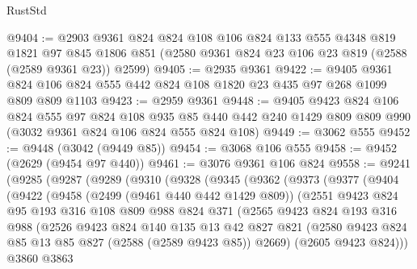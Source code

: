 \begin{lexlean}{RustStd}
\begin{coremodule}
@9404 := @2903
    @9361
    @824
    @824
    @108
    @106
    @824
    @133
    @555
    @4348
    @819
    @1821
    @97
    @845
    @1806
    @851
    (@2580 @9361 @824 @23 @106 @23 @819 (@2588 (@2589 @9361 @23)) @2599)
@9405 := @2935 @9361
@9422 := @9405
    @9361
    @824
    @106
    @824
    @555
    @442
    @824
    @108
    @1820
    @23
    @435
    @97
    @268
    @1099
    @809
    @809
    @1103
@9423 := @2959 @9361
@9448 := @9405
    @9423
    @824
    @106
    @824
    @555
    @97
    @824
    @108
    @935
    @85
    @440
    @442
    @240
    @1429
    @809
    @809
    @990
    (@3032 @9361 @824 @106 @824 @555 @824 @108)
@9449 := @3062 @555
@9452 := @9448 (@3042 (@9449 @85))
@9454 := @3068 @106 @555
@9458 := @9452 (@2629 (@9454 @97 @440))
@9461 := @3076 @9361 @106 @824
@9558 := @9241
    (@9285
      (@9287
        (@9289
          (@9310
            (@9328
              (@9345
                (@9362
                  (@9373
                    (@9377
                      (@9404
                        (@9422
                          (@9458
                            (@2499 (@9461 @440 @442 @1429 @809))
                            (@2551
                              @9423
                              @824
                              @95
                              @193
                              @316
                              @108
                              @809
                              @988
                              @824
                              @371
                              (@2565
                                @9423
                                @824
                                @193
                                @316
                                @988
                                (@2526
                                  @9423
                                  @824
                                  @140
                                  @135
                                  @13
                                  @42
                                  @827
                                  @821
                                  (@2580
                                    @9423
                                    @824
                                    @85
                                    @13
                                    @85
                                    @827
                                    (@2588 (@2589 @9423 @85))
                                    @2669)
                                  (@2605 @9423 @824)))
                              @3860
                              @3863

\end{coremodule}
\end{lexlean}

